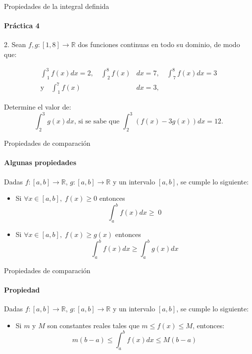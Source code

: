 \documentclass{plantillaPPT}
\begin{document}
\begin{frame}{Propiedades de la integral definida}
    \framesubtitle{Práctica 4}
    
2. Sean \(f,g:[1,8]\to \mathbb{R}\) dos funciones continuas en todo su dominio, de modo que:

\begin{align*}
\int_{\, 1}^{3}f(x)dx = 2, \quad \int_{\, 2}^{8}f(x)&dx = 7,\quad \int_{\, 7}^{8}f(x)dx = 3 \\
\text{y} \quad \int_{\, 1}^{7}f(x)&dx = 3, 
\end{align*}

Determine el valor de: 
\[\int_{\, 2}^{3}g(x)dx\text{, si se sabe que } \int_{\, 2}^{3}(f(x)-3g(x))dx = 12.\]

\end{frame}

\begin{frame}{Propiedades de comparación}
    \framesubtitle{Algunas propiedades}

Dadas \(f:[a,b] \to \mathbb{R} \), \(g: [a,b] \to \mathbb{R} \) y un intervalo \([a,b]\), se cumple lo siguiente: \vspace{0.5cm}

\begin{itemize}
    \item Si \(\forall x\in[a,b], \; f(x)\geq0\) entonces 
    \[\int_{a}^{b}f(x)dx \geq \; 0\] \vspace{0.1cm}
    \item Si \(\forall x \in [a,b],\; f(x)\geq g(x)\) entonces
    \[\int_{a}^{b}f(x)dx\geq \int_{a}^{b}g(x)dx\]
\end{itemize}

\end{frame}

\begin{frame}{Propiedades de comparación}
    \framesubtitle{Propiedad}

Dadas \(f:[a,b] \to \mathbb{R} \), \(g: [a,b] \to \mathbb{R} \) y un intervalo \([a,b]\), se cumple lo siguiente: \vspace{0.5cm}

\begin{itemize}
    \item Si \(m\) y \(M\) son constantes reales tales que \(m\leq f(x) \leq M\), entonces:
    \[m(b-a) \leq \int_{a}^{b} f(x)dx \leq M(b-a)\]

\end{itemize}
    
\end{frame}
\end{document}
